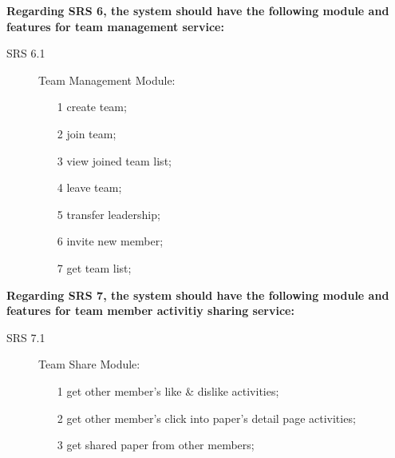 \noindent
\textbf{Regarding SRS 6, the system should have the following module and features for team management service:}

\begin{description}
    \item[SRS 6.1] Team Management Module:
    \begin{itemize}
        \item [1]
              create team;
        \item [2]
              join team;
        \item [3]
              view joined team list;
        \item [4]
              leave team;
        \item [5]
              transfer leadership;
        \item [6]
              invite new member;
        \item [7]
              get team list;
    \end{itemize}
\end{description}

\noindent
\textbf{Regarding SRS 7, the system should have the following module and features for team member activitiy sharing service:}

\begin{description}
    \item[SRS 7.1] Team Share Module:
    \begin{itemize}
        \item [1]
              get other member's like \& dislike activities;
        \item [2]
              get other member's click into paper's detail page activities;
        \item [3]
              get shared paper from other members;
    \end{itemize}
\end{description}
